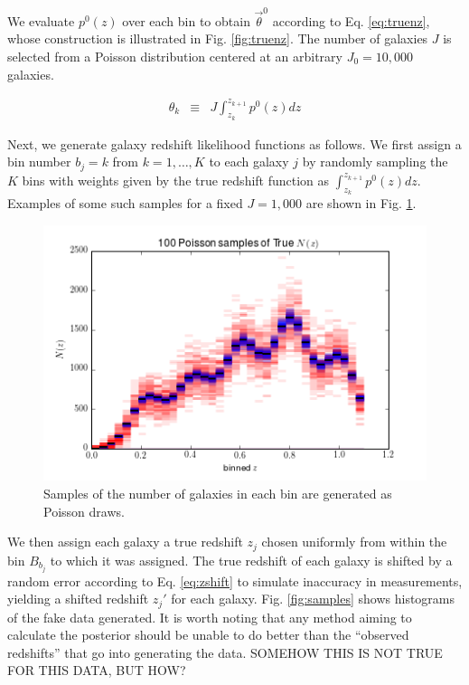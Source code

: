 \documentclass[12pt, onecolumn]{emulateapj}
\begin{document}
We evaluate $p^{0}(z)$ over each bin to obtain $\vec{\theta}^{0}$ according to Eq. \ref{eq:truenz}, whose construction is illustrated in Fig. \ref{fig:truenz}.  The number of galaxies $J$ is selected from a Poisson distribution centered at an arbitrary $J_{0}=10,000$ galaxies.

\begin{eqnarray}
\label{eq:truenz}
\theta_{k} &\equiv& J\int_{z_{k}}^{z_{k+1}}p^{0}(z) dz
\end{eqnarray}

Next, we generate galaxy redshift likelihood functions as follows.  We first assign a bin number $b_{j}=k$ from $k=1,\dots,K$ to each galaxy $j$ by randomly sampling the $K$ bins with weights given by the true redshift function as $\int_{z_{k}}^{z_{k+1}}p^{0}(z)dz$.  Examples of some such samples for a fixed $J=1,000$ are shown in Fig. \ref{fig:obsnz}.

\begin{figure}
\label{fig:obsnz}
\includegraphics[scale=0.5]{obsNz.png}
\caption{Samples of the number of galaxies in each bin are generated as Poisson draws.}
\end{figure}

We then assign each galaxy a true redshift $z_{j}$ chosen uniformly from within the bin $B_{b_{j}}$ to which it was assigned.  The true redshift of each galaxy is shifted by a random error according to Eq. \ref{eq:zshift} to simulate inaccuracy in measurements, yielding a shifted redshift $z_{j}'$ for each galaxy.  Fig. \ref{fig:samples} shows histograms of the fake data generated.  It is worth noting that any method aiming to calculate the posterior should be unable to do better than the ``observed redshifts'' that go into generating the data.  SOMEHOW THIS IS NOT TRUE FOR THIS DATA, BUT HOW?
\end{document}
